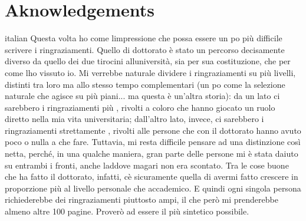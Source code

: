 
% 

{
\chapter*{Aknowledgements}
\label{aknowledgements}
}

\begin{otherlanguage*}{italian}
Questa volta ho come l\curlyapostrophe{}impressione che possa essere un po\curlyapostrophe{} più difficile scrivere i ringraziamenti. Quello di dottorato è stato un percorso decisamente diverso da quello dei due tirocini all\curlyapostrophe{}università, sia per sua costituzione, che per come l\curlyapostrophe{}ho vissuto io. Mi verrebbe naturale dividere i ringraziamenti su più livelli, distinti tra loro ma allo stesso tempo complementari (un po\curlyapostrophe{} come la selezione naturale che agisce su più piani... ma questa è un'altra storia): da un lato ci sarebbero i ringraziamenti più , rivolti a coloro che hanno giocato un ruolo diretto nella mia vita universitaria; dall'altro lato, invece, ci sarebbero i ringraziamenti strettamente , rivolti alle persone che con il dottorato hanno avuto poco o nulla a che fare. Tuttavia, mi resta difficile pensare ad una distinzione così netta, perché, in una qualche maniera, gran parte delle persone mi è stata d\curlyapostrophe{}aiuto su entrambi i fronti, anche laddove magari non era scontato. Tra le cose buone che ha fatto il dottorato, infatti, c\curlyapostrophe{}è sicuramente quella di avermi fatto crescere in proporzione più al livello personale che accademico. E quindi ogni singola persona richiederebbe dei ringraziamenti piuttosto ampi, il che però mi prenderebbe almeno altre 100 pagine. Proverò ad essere il più sintetico possibile.



\end{otherlanguage*}
